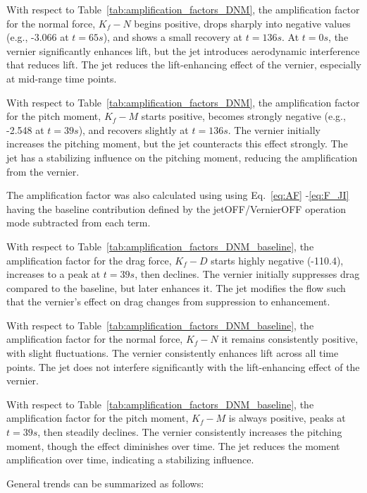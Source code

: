 \documentclass[12pt]{article}
\begin{document}
With respect to Table~\ref{tab:amplification_factors_DNM}, the amplification factor for the normal force, $K_f-N$ begins positive, drops sharply into negative values (e.g., -3.066 at $t=65s$), and shows a small recovery at $t=136s$. At $t=0s$, the vernier significantly enhances lift, but the jet introduces aerodynamic interference that reduces lift. The jet reduces the lift-enhancing effect of the vernier, especially at mid-range time points.

With respect to Table~\ref{tab:amplification_factors_DNM}, the amplification factor for the pitch moment, $K_f-M$ starts positive, becomes strongly negative (e.g., -2.548 at $t=39s$), and recovers slightly at $t=136s$. The vernier initially increases the pitching moment, but the jet counteracts this effect strongly. The jet has a stabilizing influence on the pitching moment, reducing the amplification from the vernier.

The amplification factor was also calculated using using Eq.~\ref{eq:AF} -\ref{eq:F_JI} having the baseline contribution defined by the jetOFF/VernierOFF operation mode subtracted from each term.

With respect to Table~\ref{tab:amplification_factors_DNM_baseline}, the amplification factor for the drag force, $K_f-D$ starts highly negative (-110.4), increases to a peak at $t=39s$, then declines. The vernier initially suppresses drag compared to the baseline, but later enhances it. The jet modifies the flow such that the vernier's effect on drag changes from suppression to enhancement.

With respect to Table~\ref{tab:amplification_factors_DNM_baseline}, the amplification factor for the normal force, $K_f-N$ it remains consistently positive, with slight fluctuations. The vernier consistently enhances lift across all time points. The jet does not interfere significantly with the lift-enhancing effect of the vernier.

With respect to Table~\ref{tab:amplification_factors_DNM_baseline}, the amplification factor for the pitch moment, $K_f-M$ is always positive, peaks at $t=39s$, then steadily declines. The vernier consistently increases the pitching moment, though the effect diminishes over time. The jet reduces the moment amplification over time, indicating a stabilizing influence.

General trends can be summarized as follows:
\end{document}

